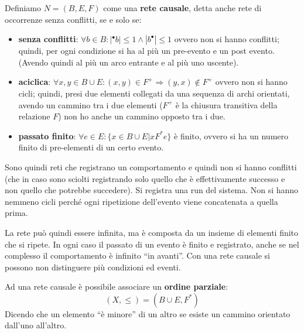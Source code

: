 \begin{definizione}
    Definiamo $N = (B,E, F)$ come una \textbf{rete causale}, detta anche rete di
    occorrenze senza conflitti, se e solo se:
    \begin{itemize}
        \item \textbf{senza conflitti}: $\forall b \in B: |^{\bullet}b| \leq 1
                  \land |b^{\bullet}| \leq 1$ ovvero non si hanno conflitti;
              quindi, per ogni condizione si ha al più un pre-evento e un post
              evento. (Avendo quindi al più un arco entrante e al più uno uscente).
        \item \textbf{aciclica}: $\forall x, y \in B \cup E: (x, y) \in F^{+}
                  \Rightarrow (y, x) \notin F^{+}$ ovvero non si hanno cicli;
              quindi, presi due elementi collegati da una sequenza di archi
              orientati, avendo un cammino tra i due elementi ($F^{+}$ è la chiusura
              transitiva della relazione $F$) non ho anche un cammino opposto
              tra i due.
        \item \textbf{passato finito}: $\forall e \in E: \{x \in B \cup E |
                  xF^{\ast}e\}$ è finito, ovvero si ha un numero finito di
              pre-elementi di un certo evento.
    \end{itemize}
    Sono quindi reti che registrano un comportamento e quindi non si hanno
    conflitti (che in caso sono sciolti registrando solo quello che è effettivamente
    successo e non quello che potrebbe succedere). Si registra una run del sistema.
    Non si hanno nemmeno cicli perché ogni ripetizione dell'evento viene concatenata
    a quella prima.

    La rete può quindi essere infinita, ma è composta da un insieme di elementi
    finito che si ripete. In ogni caso il passato di un evento è finito e registrato,
    anche se nel complesso il comportamento è infinito “in avanti”. Con una rete
    causale si possono non distinguere più condizioni ed eventi.
\end{definizione}
Ad una rete causale è possibile associare un \textbf{ordine parziale}:
\begin{equation}
    (X, \leq) = (B \cup E, F^{\ast})
\end{equation}
Dicendo che un elemento “è minore” di un altro se esiste un cammino orientato
dall'uno all'altro.
